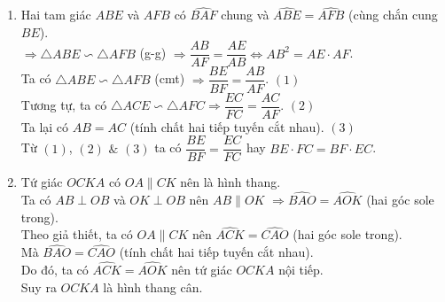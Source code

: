 \begin{ex}
{\begin{enumerate}
{}
		\item Hai tam giác $ABE$ và $AFB$ có $\widehat{BAF}$ chung và $\widehat{ABE}=\widehat{AFB}$ (cùng chắn cung $BE$).\\
				$\Rightarrow \triangle ABE \backsim \triangle AFB$ (g-g) $\Rightarrow \dfrac{AB}{AF}=\dfrac{AE}{AB} \Leftrightarrow AB^2=AE\cdot AF$.\\
				Ta có $\triangle ABE \backsim \triangle AFB$ (cmt) $\Rightarrow \dfrac{BE}{BF}=\dfrac{AB}{AF}$. \hfill $(1)$\\
				Tương tự, ta có $\triangle ACE \backsim \triangle AFC \Rightarrow \dfrac{EC}{FC}=\dfrac{AC}{AF}$. \hfill $(2)$\\
				Ta lại có $AB=AC$ (tính chất hai tiếp tuyến cắt nhau). \hfill $(3)$\\
				Từ $(1)$, $(2)$ $\&$ $(3)$ ta có $\dfrac{BE}{BF}=\dfrac{EC}{FC}$ hay $BE \cdot FC = BF \cdot EC$.
		\item Tứ giác $OCKA$ có $OA \parallel CK$ nên là hình thang.\\
				Ta có $AB \perp OB$ và $OK \perp OB$ nên $AB \parallel OK$ $\Rightarrow \widehat{BAO}=\widehat{AOK}$ (hai góc sole trong).\\
				Theo giả thiết, ta có $OA \parallel CK$ nên $\widehat{ACK}=\widehat{CAO}$ (hai góc sole trong).\\
				Mà $\widehat{BAO}=\widehat{CAO}$ (tính chất hai tiếp tuyến cắt nhau).\\
				Do đó, ta có $\widehat{ACK}=\widehat{AOK}$ nên tứ giác $OCKA$ nội tiếp.\\
				Suy ra $OCKA$ là hình thang cân.
\end{enumerate}
}
\end{ex}
